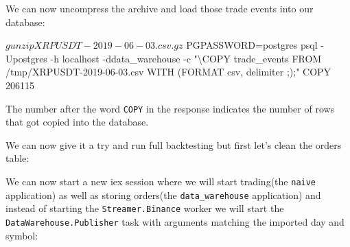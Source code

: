 \documentclass[
]{book}
\newenvironment{Shaded}{\begin{snugshade}}{\end{snugshade}}
\newcommand{\AttributeTok}[1]{\textcolor[rgb]{0.77,0.63,0.00}{#1}}
\newcommand{\ExtensionTok}[1]{#1}
\newcommand{\KeywordTok}[1]{\textcolor[rgb]{0.13,0.29,0.53}{\textbf{#1}}}
\newcommand{\NormalTok}[1]{#1}
\newcommand{\StringTok}[1]{\textcolor[rgb]{0.31,0.60,0.02}{#1}}
\newcommand{\VariableTok}[1]{\textcolor[rgb]{0.00,0.00,0.00}{#1}}
\begin{document}
We can now uncompress the archive and load those trade events into our database:

\begin{Shaded}
\begin{Highlighting}[]
\ExtensionTok{$}\NormalTok{ gunzip XRPUSDT{-}2019{-}06{-}03.csv.gz}
\ExtensionTok{$}\NormalTok{ PGPASSWORD=postgres psql }\AttributeTok{{-}Upostgres} \AttributeTok{{-}h}\NormalTok{ localhost }\AttributeTok{{-}ddata\_warehouse}  \AttributeTok{{-}c} \StringTok{"\textbackslash{}COPY trade\_events FROM \textquotesingle{}/tmp/XRPUSDT{-}2019{-}06{-}03.csv\textquotesingle{} WITH (FORMAT csv, delimiter \textquotesingle{};\textquotesingle{});"}
\ExtensionTok{COPY}\NormalTok{ 206115}
\end{Highlighting}
\end{Shaded}

The number after the word \texttt{COPY} in the response indicates the number of rows that got copied into the database.

We can now give it a try and run full backtesting but first let's clean the orders table:

\begin{Shaded}
\end{Shaded}

We can now start a new iex session where we will start trading(the \texttt{naive} application) as well as storing orders(the \texttt{data\_warehouse} application) and instead of starting the \texttt{Streamer.Binance} worker we will start the \texttt{DataWarehouse.Publisher} task with arguments matching the imported day and symbol:
\end{document}
